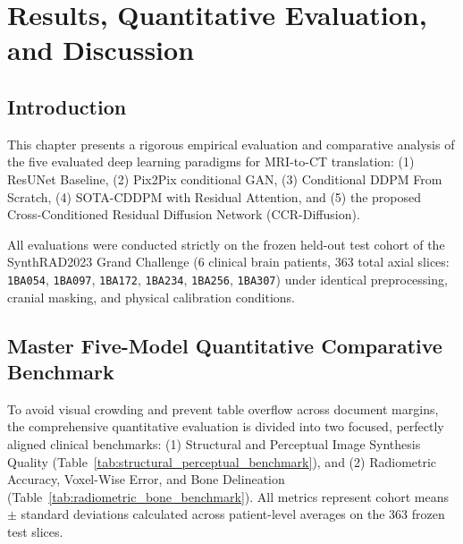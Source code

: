 \chapter{Results, Quantitative Evaluation, and Discussion}

\section{Introduction}
This chapter presents a rigorous empirical evaluation and comparative analysis of the five evaluated deep learning paradigms for MRI-to-CT translation:
(1) ResUNet Baseline,
(2) Pix2Pix conditional GAN,
(3) Conditional DDPM From Scratch,
(4) SOTA-CDDPM with Residual Attention, and
(5) the proposed Cross-Conditioned Residual Diffusion Network (CCR-Diffusion).

All evaluations were conducted strictly on the frozen held-out test cohort of the SynthRAD2023 Grand Challenge (6 clinical brain patients, 363 total axial slices: \texttt{1BA054}, \texttt{1BA097}, \texttt{1BA172}, \texttt{1BA234}, \texttt{1BA256}, \texttt{1BA307}) under identical preprocessing, cranial masking, and physical calibration conditions.

\section{Master Five-Model Quantitative Comparative Benchmark}
To avoid visual crowding and prevent table overflow across document margins, the comprehensive quantitative evaluation is divided into two focused, perfectly aligned clinical benchmarks: (1) Structural and Perceptual Image Synthesis Quality (Table~\ref{tab:structural_perceptual_benchmark}), and (2) Radiometric Accuracy, Voxel-Wise Error, and Bone Delineation (Table~\ref{tab:radiometric_bone_benchmark}). All metrics represent cohort means $\pm$ standard deviations calculated across patient-level averages on the 363 frozen test slices.

